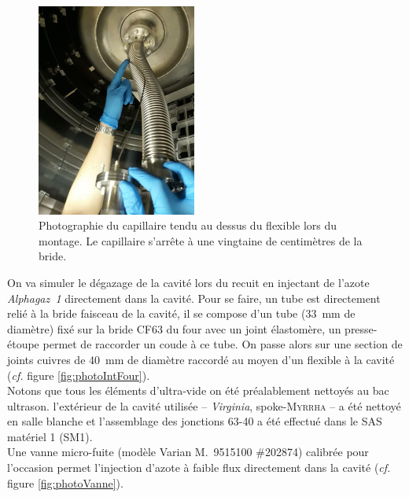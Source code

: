 \begin{figure}
    \centering
    \includegraphics[height=7cm]{Figures/IMG-20180410-WA0025.jpg}%
    \caption[Photographie du capillaire tendu au dessus du flexible.]{Photographie du capillaire tendu au dessus du flexible lors du montage. Le capillaire s'arrête à une vingtaine de centimètres de la bride.}
    \label{fig:photoCapilaire}
\end{figure}
On va simuler le dégazage de la cavité lors du recuit en injectant de l'azote \textit{Alphagaz~1} directement dans la cavité. Pour se faire, un tube est directement relié à la bride faisceau de la cavité, il se compose d'un tube (\SI{33}{\milli\meter} de diamètre) fixé sur la bride CF63 du four avec un joint élastomère, un presse-étoupe permet de raccorder un coude à ce tube. On passe alors sur une section de joints cuivres de \SI{40}{\milli\meter} de diamètre raccordé au moyen d'un flexible à la cavité (\textit{cf.} figure \ref{fig:photoIntFour}).\\
Notons que tous les éléments d'ultra-vide on été préalablement nettoyés au bac ultrason. l'extérieur de la cavité utilisée -- \textit{Virginia}, spoke-\textsc{Myrrha} -- a été nettoyé en salle blanche et l'assemblage des jonctions 63-40 a été effectué dans le SAS matériel 1 (SM1).\\
Une vanne micro-fuite (modèle Varian M.~9515100 \#202874\cite{varianValve}) calibrée pour l'occasion permet l'injection d'azote à faible flux directement dans la cavité (\textit{cf.} figure \ref{fig:photoVanne}).
